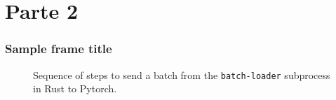 \section{Parte 2}

\begin{frame}
\frametitle{Sample frame title}

\begin{figure}[H]
\centering
{}
\caption{Sequence of steps to send a batch from the \texttt{batch-loader} subprocess in Rust to Pytorch.}
\label{training-loop}
\end{figure}
\end{frame}


